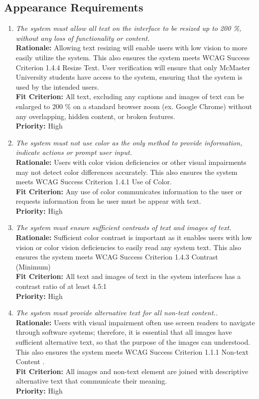 \documentclass[12pt]{article}
\begin{document}
\subsection{Appearance Requirements}
\begin{enumerate}[label=LFR-AR \arabic*., wide=0pt, leftmargin=*]
  \item \emph{The system must allow all text on the interface to be resized up to 200 \%, without any loss of functionality or content. }\\[2mm] 
    {\bf Rationale:} Allowing text resizing will enable users with low vision to more easily utilize the system. This also ensures the system meets WCAG Success Criterion 1.4.4 Resize Text.
    User verification will ensure that only McMaster University students have access to the system, ensuring that the system is used by the intended users.  \\
    {\bf Fit Criterion:} All text, excluding any captions and images of text can be enlarged to 200 \% on a standard browser zoom (ex. Google Chrome) without any overlapping, hidden content, or broken features.  \\
    {\bf Priority:} High
  \item \emph{The system must not use color as the only method to provide information, indicate actions or prompt user input.}\\[2mm] 
    {\bf Rationale:} Users with color vision deficiencies or other visual impairments may not detect color differences accurately. This also ensures the system meets WCAG Success Criterion 1.4.1 Use of Color.\\
    {\bf Fit Criterion:} Any use of color communicates information to the user or requests information from he user must be appear with text.  \\
    {\bf Priority:} High
  \item \emph{The system must ensure sufficient contrasts of text and images of text.}\\[2mm] 
    {\bf Rationale:} Sufficient color contrast is important as it enables users with low vision or color vision deficiencies to easily read any system text. This also ensures the system meets WCAG Success Criterion 1.4.3 Contrast (Minimum)\\
    {\bf Fit Criterion:}  All text and images of text in the system interfaces has a contrast ratio of at least 4.5:1  \\
    {\bf Priority:} High
  \item \emph{The system must provide alternative text for all non-text content..}\\[2mm] 
    {\bf Rationale:} Users with visual impairment often use screen readers to navigate through software systems; therefore, it is essential that all images have sufficient alternative text, so that the purpose of the images can understood. This also ensures the system meets WCAG Success Criterion 1.1.1 Non-text Content  .\\
    {\bf Fit Criterion:} All images and non-text element are joined with descriptive alternative text that communicate their meaning. \\
    {\bf Priority:} High
\end{enumerate}
\end{document}
